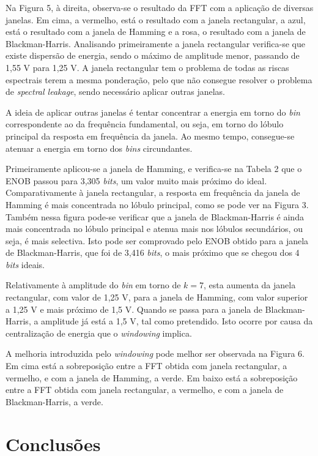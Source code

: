 \documentclass[11pt]{article}
\numberwithin{equation}{section}
\begin{document}
Na Figura 5, à direita, observa-se o resultado da FFT com a aplicação de diversas janelas. Em cima, a vermelho, está o resultado com a janela rectangular, a azul, está o resultado com a janela de Hamming e a rosa, o resultado com a janela de Blackman-Harris. Analisando primeiramente a janela rectangular verifica-se que existe dispersão de energia, sendo o máximo de amplitude menor, passando de 1,55 V para 1,25 V. A janela rectangular tem o problema de todas as riscas espectrais terem a mesma ponderação, pelo que não consegue resolver o problema de \textit{spectral leakage}, sendo necessário aplicar outras janelas.

A ideia de aplicar outras janelas é tentar concentrar a energia em torno do \textit{bin} correspondente ao da frequência fundamental, ou seja, em torno do lóbulo principal da resposta em frequência da janela. Ao mesmo tempo, consegue-se atenuar a energia em torno dos \textit{bins} circundantes.

Primeiramente aplicou-se a janela de Hamming, e verifica-se na Tabela 2 que o ENOB passou para 3,305 \textit{bits}, um valor muito mais próximo do ideal. Comparativamente à janela rectangular, a resposta em frequência da janela de Hamming é mais concentrada no lóbulo principal, como se pode ver na Figura 3. Também nessa figura pode-se verificar que a janela de Blackman-Harris é ainda mais concentrada no lóbulo principal e atenua mais nos lóbulos secundários, ou seja, é mais selectiva. Isto pode ser comprovado pelo ENOB obtido para a janela de Blackman-Harris, que foi de 3,416 \textit{bits}, o mais próximo que se chegou dos 4 \textit{bits} ideais.

Relativamente à amplitude do \textit{bin} em torno de $k = 7$, esta aumenta da janela rectangular, com valor de 1,25 V, para a janela de Hamming, com valor superior a 1,25 V e mais próximo de 1,5 V. Quando se passa para a janela de Blackman-Harris, a amplitude já está a 1,5 V, tal como pretendido. Isto ocorre por causa da centralização de energia que o \textit{windowing} implica.

A melhoria introduzida pelo \textit{windowing} pode melhor ser observada na Figura 6. Em cima está a sobreposição entre a FFT obtida com janela rectangular, a vermelho, e com a janela de Hamming, a verde. Em baixo está a sobreposição entre a FFT obtida com janela rectangular, a vermelho, e com a janela de Blackman-Harris, a verde.

\section{Conclusões}


	 
\end{document}
